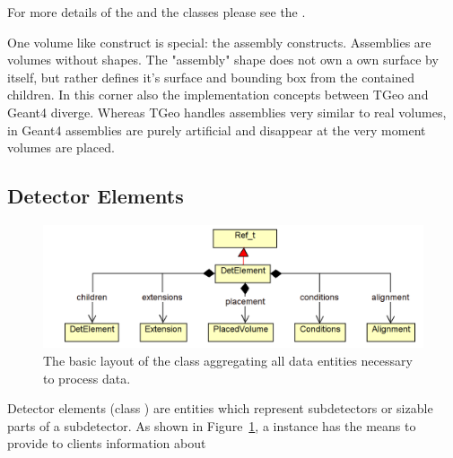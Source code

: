 \documentclass[10pt,a4paper]{article}
\begin{document}
\noindent
For more details of the  and the  classes please see the 
.

\noindent
One volume like construct is special: the assembly constructs.
Assemblies are volumes without shapes. The "assembly" shape does not
own a own surface by itself, but rather defines it's surface and 
bounding box from the contained children.
In this corner also the implementation concepts between TGeo and Geant4 diverge.
Whereas TGeo handles assemblies very similar to real volumes, in Geant4 
assemblies are purely artificial and disappear at the very moment volumes 
are placed.

\newpage
\subsection{Detector Elements}
\label{sec:dd4hep-user-manual-detector-elements}
\begin{figure}[b]
  \begin{center}
    \includegraphics[width=160mm] {DD4hep-detelement-drawing.png}
    \caption{The basic layout of the  class aggregating
        all data entities necessary to process data.}
    \label{fig:dd4hep-user-manual-detelement-drawing}
  \end{center}
  \vspace{-0.6cm}
\end{figure}

\noindent
Detector elements (class ) are entities which represent 
subdetectors or sizable parts of a subdetector.
As shown in Figure~\ref{fig:dd4hep-user-manual-detelement-drawing},
a  instance has the means to provide to clients information about
\end{document}
